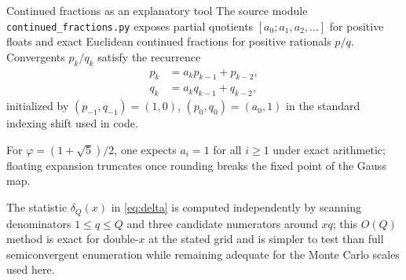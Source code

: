 \documentclass[
  ignorenonframetext,
]{beamer}
\author{\texorpdfstring{}{}}
\date{}
\begin{document}
\begin{frame}[fragile]{Continued fractions as an explanatory tool}
\protect{}\label{continued-fractions-as-an-explanatory-tool}
The source module \texttt{continued\_fractions.py} exposes partial
quotients \([a_0; a_1, a_2, \ldots]\) for positive floats and exact
Euclidean continued fractions for positive rationals \(p/q\).
Convergents \(p_k/q_k\) satisfy the recurrence \begin{align}
p_k &= a_k p_{k-1} + p_{k-2}, \\
q_k &= a_k q_{k-1} + q_{k-2},
\end{align} initialized by \((p_{-1},q_{-1})=(1,0)\),
\((p_0,q_0)=(a_0,1)\) in the standard indexing shift used in code.

For \(\varphi = (1+\sqrt{5})/2\), one expects \(a_i=1\) for all
\(i \geq 1\) under exact arithmetic; floating expansion truncates once
rounding breaks the fixed point of the Gauss map.

The statistic \(\delta_Q(x)\) in \eqref{eq:delta} is computed
independently by scanning denominators \(1 \leq q \leq Q\) and three
candidate numerators around \(xq\); this \(O(Q)\) method is exact for
double-\(x\) at the stated grid and is simpler to test than full
semiconvergent enumeration while remaining adequate for the Monte Carlo
scales used here.
\end{frame}
\end{document}
